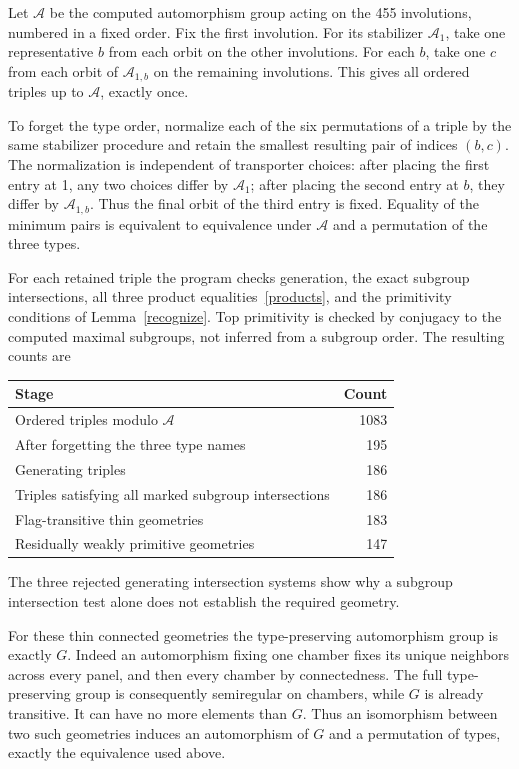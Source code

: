 \documentclass[11pt,a4paper]{article}
\begin{document}
Let $\mathcal A$ be the computed automorphism group acting on the 455
involutions, numbered in a fixed order. Fix the first involution. For its
stabilizer $\mathcal A_1$, take one representative $b$ from each orbit on
the other involutions. For each $b$, take one $c$ from each orbit of
$\mathcal A_{1,b}$ on the remaining involutions. This gives all ordered
triples up to $\mathcal A$, exactly once.

To forget the type order, normalize each of the six permutations of a
triple by the same stabilizer procedure and retain the smallest resulting
pair of indices $(b,c)$. The normalization is independent of transporter
choices: after placing the first entry at 1, any two choices differ by
$\mathcal A_1$; after placing the second entry at $b$, they differ by
$\mathcal A_{1,b}$. Thus the final orbit of the third entry is fixed.
Equality of the minimum pairs is equivalent to equivalence under
$\mathcal A$ and a permutation of the three types.

For each retained triple the program checks generation, the exact
subgroup intersections, all three product equalities~\eqref{products},
and the primitivity conditions of Lemma~\ref{recognize}. Top primitivity
is checked by conjugacy to the computed maximal subgroups, not inferred
from a subgroup order. The resulting counts are
\begin{center}\begin{tabular}{lr}\toprule
Stage & Count\\\midrule
Ordered triples modulo $\mathcal A$ & 1083\\
After forgetting the three type names & 195\\
Generating triples & 186\\
Triples satisfying all marked subgroup intersections & 186\\
Flag-transitive thin geometries & 183\\
Residually weakly primitive geometries & 147\\\bottomrule
\end{tabular}\end{center}
The three rejected generating intersection systems show why a subgroup
intersection test alone does not establish the required geometry.

For these thin connected geometries the type-preserving automorphism
group is exactly $G$. Indeed an automorphism fixing one chamber fixes its
unique neighbors across every panel, and then every chamber by connectedness.
The full type-preserving group is consequently semiregular on chambers,
while $G$ is already transitive. It can have no more elements than $G$.
Thus an isomorphism between two such geometries induces an automorphism
of $G$ and a permutation of types, exactly the equivalence used above.
\end{document}
